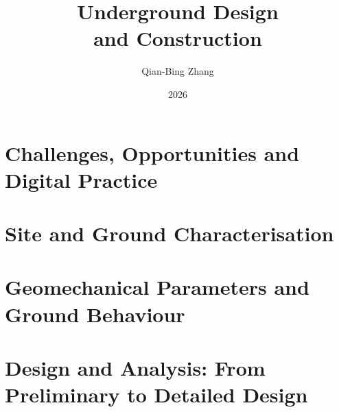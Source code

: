 \documentclass[graybox,envcountchap,sectrefs]{SNmono}
\begin{document}
\author{Qian-Bing Zhang}
\title{{\huge Underground Design\\ and Construction}}
\date{2026}
\maketitle

\frontmatter




\tableofcontents




\mainmatter

\part{Challenges, Opportunities and Digital Practice}\label{part:context}




\part{Site and Ground Characterisation}\label{part:characterisation}








\part{Geomechanical Parameters and Ground Behaviour}\label{part:parameters}





\part{Design and Analysis: From Preliminary to Detailed Design}\label{part:design}







\end{document}
